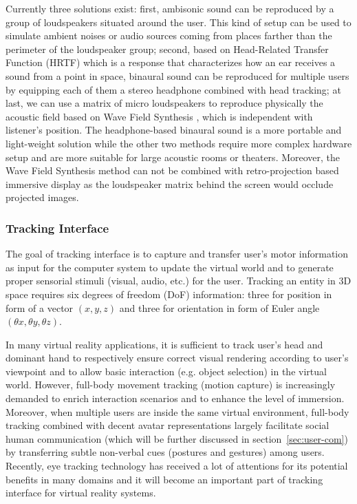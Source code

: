 Currently three solutions exist: first, ambisonic sound can be reproduced by a group of loudspeakers situated around the user. This kind of setup can be used to simulate ambient noises or audio sources coming from places farther than the perimeter of the loudspeaker group; second, based on Head-Related Transfer Function (HRTF) \citep{Kistler1992HRTF} which is a response that characterizes how an ear receives a sound from a point in space, binaural sound can be reproduced for multiple users by equipping each of them a stereo headphone combined with head tracking; at last, we can use a matrix of micro loudspeakers to reproduce physically the acoustic field based on Wave Field Synthesis \citep{Verheijen1998WFS}, which is independent with listener's position. The headphone-based binaural sound is a more portable and light-weight solution while the other two methods require more complex hardware setup and are more suitable for large acoustic rooms or theaters. Moreover, the Wave Field Synthesis method can not be combined with retro-projection based immersive display as the loudspeaker matrix behind the screen would occlude projected images.

\subsubsection{Tracking Interface}
\label{sec:tracking}
The goal of tracking interface is to capture and transfer user's motor information as input for the computer system to update the virtual world and to generate proper sensorial stimuli (visual, audio, etc.) for the user. Tracking an entity in 3D space requires six degrees of freedom (DoF) information: three for position in form of a vector $(x, y, z)$ and three for orientation in form of Euler angle $(\theta{x},\theta{y},\theta{z})$.

In many virtual reality applications, it is sufficient to track user's head and dominant hand to respectively ensure correct visual rendering according to user's viewpoint and to allow basic interaction (e.g. object selection) in the virtual world. However, full-body movement tracking (motion capture) is increasingly demanded to enrich interaction scenarios and to enhance the level of immersion. Moreover, when multiple users are inside the same virtual environment, full-body tracking combined with decent avatar representations largely facilitate social human communication (which will be further discussed in section~\ref{sec:user-com}) by transferring subtle non-verbal cues (postures and gestures) among users. Recently, eye tracking technology has received a lot of attentions for its potential benefits in many domains \citep{Duchowski2007Eye} and it will become an important part of tracking interface for virtual reality systems.

